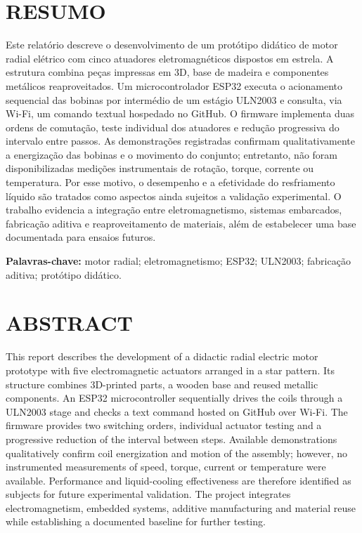 \documentclass[12pt,a4paper,oneside]{article}
\begin{document}
\hypersetup{pageanchor=true}

\section*{RESUMO}
Este relatório descreve o desenvolvimento de um protótipo didático de motor radial elétrico com cinco atuadores eletromagnéticos dispostos em estrela. A estrutura combina peças impressas em 3D, base de madeira e componentes metálicos reaproveitados. Um microcontrolador ESP32 executa o acionamento sequencial das bobinas por intermédio de um estágio ULN2003 e consulta, via Wi-Fi, um comando textual hospedado no GitHub. O firmware implementa duas ordens de comutação, teste individual dos atuadores e redução progressiva do intervalo entre passos. As demonstrações registradas confirmam qualitativamente a energização das bobinas e o movimento do conjunto; entretanto, não foram disponibilizadas medições instrumentais de rotação, torque, corrente ou temperatura. Por esse motivo, o desempenho e a efetividade do resfriamento líquido são tratados como aspectos ainda sujeitos a validação experimental. O trabalho evidencia a integração entre eletromagnetismo, sistemas embarcados, fabricação aditiva e reaproveitamento de materiais, além de estabelecer uma base documentada para ensaios futuros.

\noindent\textbf{Palavras-chave:} motor radial; eletromagnetismo; ESP32; ULN2003; fabricação aditiva; protótipo didático.
\clearpage

\section*{ABSTRACT}
This report describes the development of a didactic radial electric motor prototype with five electromagnetic actuators arranged in a star pattern. Its structure combines 3D-printed parts, a wooden base and reused metallic components. An ESP32 microcontroller sequentially drives the coils through a ULN2003 stage and checks a text command hosted on GitHub over Wi-Fi. The firmware provides two switching orders, individual actuator testing and a progressive reduction of the interval between steps. Available demonstrations qualitatively confirm coil energization and motion of the assembly; however, no instrumented measurements of speed, torque, current or temperature were available. Performance and liquid-cooling effectiveness are therefore identified as subjects for future experimental validation. The project integrates electromagnetism, embedded systems, additive manufacturing and material reuse while establishing a documented baseline for further testing.
\end{document}
